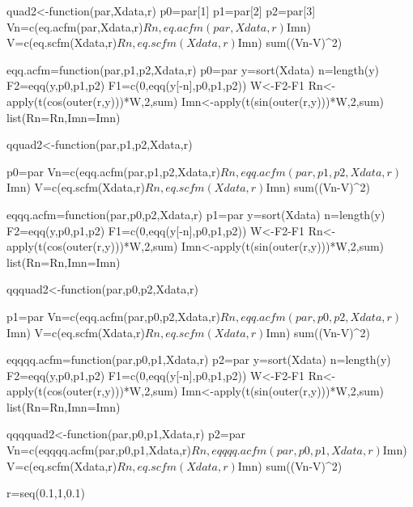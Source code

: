 quad2<-function(par,Xdata,r){
    p0=par[1]
    p1=par[2]
    p2=par[3]
    Vn=c(eq.acfm(par,Xdata,r)$Rn,eq.acfm(par,Xdata,r)$Imn)
    V=c(eq.scfm(Xdata,r)$Rn,eq.scfm(Xdata,r)$Imn)
    sum((Vn-V)^2)
}

eqq.acfm=function(par,p1,p2,Xdata,r){
   p0=par
   y=sort(Xdata)
   n=length(y)
   F2=eqq(y,p0,p1,p2)
   F1=c(0,eqq(y[-n],p0,p1,p2))
   W<-F2-F1
   Rn<-apply(t(cos(outer(r,y)))*W,2,sum)
   Imn<-apply(t(sin(outer(r,y)))*W,2,sum)
   list(Rn=Rn,Imn=Imn)
}

qquad2<-function(par,p1,p2,Xdata,r){
    p0=par
    Vn=c(eqq.acfm(par,p1,p2,Xdata,r)$Rn,eqq.acfm(par,p1,p2,Xdata,r)$Imn)
    V=c(eq.scfm(Xdata,r)$Rn,eq.scfm(Xdata,r)$Imn)
    sum((Vn-V)^2)

}

eqqq.acfm=function(par,p0,p2,Xdata,r){
   p1=par
   y=sort(Xdata)
   n=length(y)
   F2=eqq(y,p0,p1,p2)
   F1=c(0,eqq(y[-n],p0,p1,p2))
   W<-F2-F1
   Rn<-apply(t(cos(outer(r,y)))*W,2,sum)
   Imn<-apply(t(sin(outer(r,y)))*W,2,sum)
   list(Rn=Rn,Imn=Imn)
}

qqquad2<-function(par,p0,p2,Xdata,r){
   p1=par
   Vn=c(eqq.acfm(par,p0,p2,Xdata,r)$Rn,eqq.acfm(par,p0,p2,Xdata,r)$Imn)
   V=c(eq.scfm(Xdata,r)$Rn,eq.scfm(Xdata,r)$Imn)
   sum((Vn-V)^2)

}

eqqqq.acfm=function(par,p0,p1,Xdata,r){
   p2=par
   y=sort(Xdata)
   n=length(y)
   F2=eqq(y,p0,p1,p2)
   F1=c(0,eqq(y[-n],p0,p1,p2))
   W<-F2-F1
   Rn<-apply(t(cos(outer(r,y)))*W,2,sum)
   Imn<-apply(t(sin(outer(r,y)))*W,2,sum)
   list(Rn=Rn,Imn=Imn)
}

qqqquad2<-function(par,p0,p1,Xdata,r){
   p2=par
   Vn=c(eqqqq.acfm(par,p0,p1,Xdata,r)$Rn,eqqqq.acfm(par,p0,p1,Xdata,r)$Imn)
   V=c(eq.scfm(Xdata,r)$Rn,eq.scfm(Xdata,r)$Imn)
   sum((Vn-V)^2)
}

r=seq(0.1,1,0.1)

